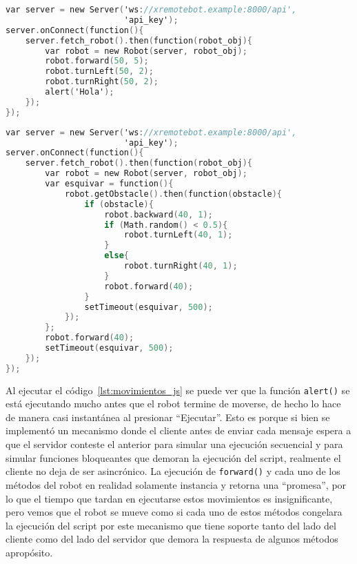\begin{lstlisting}[language=C,
caption={Secuencia de movimientos},
label=lst:movimientos_js]
var server = new Server('ws://xremotebot.example:8000/api',
                        'api_key');
server.onConnect(function(){
	server.fetch_robot().then(function(robot_obj){
		var robot = new Robot(server, robot_obj);
        robot.forward(50, 5);
        robot.turnLeft(50, 2);
        robot.turnRight(50, 2);
        alert('Hola');
	});
});
\end{lstlisting}

\begin{lstlisting}[language=C,
caption={Esquivar obstáculos},
label=lst:esquivar_js]
var server = new Server('ws://xremotebot.example:8000/api',
                        'api_key');
server.onConnect(function(){
    server.fetch_robot().then(function(robot_obj){
        var robot = new Robot(server, robot_obj);
        var esquivar = function(){
            robot.getObstacle().then(function(obstacle){
                if (obstacle){
                    robot.backward(40, 1);
                    if (Math.random() < 0.5){
                        robot.turnLeft(40, 1);
                    }
                    else{
                        robot.turnRight(40, 1);
                    }
                    robot.forward(40);
                }
                setTimeout(esquivar, 500);
            });
        };
        robot.forward(40);
        setTimeout(esquivar, 500);
    });
});
\end{lstlisting}

Al ejecutar el código~\ref{lst:movimientos_js} se puede ver que la
función \texttt{alert()} se está ejecutando mucho antes que el
robot termine de moverse, de hecho lo hace de manera casi instantánea
al presionar ``Ejecutar''. Esto es porque
si bien se implementó un mecanismo donde el cliente
antes de enviar cada mensaje espera a que el servidor conteste el
anterior para simular una ejecución secuencial y para simular
funciones bloqueantes que demoran la ejecución del script, realmente
el cliente no deja de ser asincrónico.
La ejecución de \texttt{forward()} y cada uno de los
métodos del robot en realidad solamente instancia y retorna una
``promesa'', por lo que el tiempo que tardan en ejecutarse
estos movimientos es insignificante, pero vemos que el robot
se mueve como si cada uno de estos métodos congelara la ejecución
del script por este mecanismo que tiene soporte tanto del lado
del cliente como del lado del servidor que demora la respuesta
de algunos métodos apropósito.

